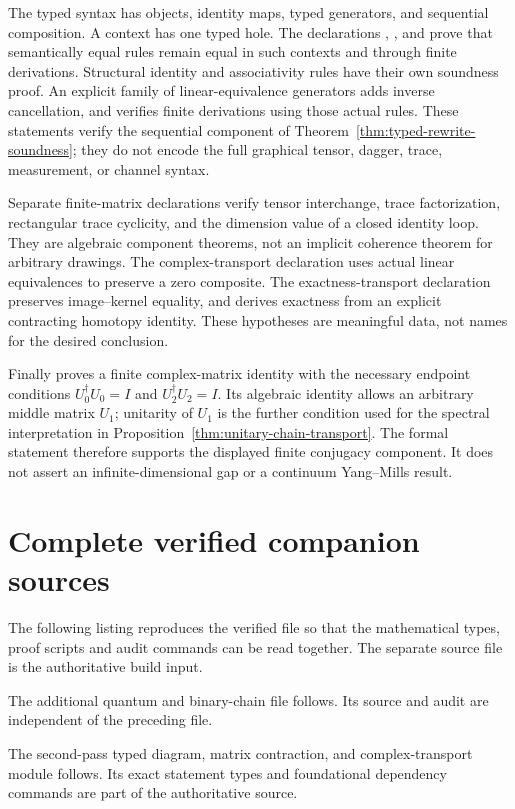 The typed syntax has objects, identity maps, typed generators, and sequential
composition. A context has one typed hole. The declarations
, , and
 prove that semantically equal rules remain equal in
such contexts and through finite derivations. Structural identity and
associativity rules have their own soundness proof. An explicit family of
linear-equivalence generators adds inverse cancellation, and
 verifies finite derivations using those actual
rules. These statements verify the sequential component of
Theorem~\ref{thm:typed-rewrite-soundness}; they do not encode the full graphical
tensor, dagger, trace, measurement, or channel syntax.

Separate finite-matrix declarations verify tensor interchange, trace
factorization, rectangular trace cyclicity, and the dimension value of a
closed identity loop. They are algebraic component theorems, not an implicit
coherence theorem for arbitrary drawings. The complex-transport declaration
uses actual linear equivalences to preserve a zero composite. The
exactness-transport declaration preserves image--kernel equality, and
 derives exactness from an explicit contracting
homotopy identity. These hypotheses are meaningful data, not names for the
desired conclusion.

Finally  proves a finite complex-matrix identity
with the necessary endpoint conditions $U_0^\dagger U_0=I$ and
$U_2^\dagger U_2=I$. Its algebraic identity allows an arbitrary middle
matrix $U_1$; unitarity of $U_1$ is the further condition used for the
spectral interpretation in Proposition~\ref{thm:unitary-chain-transport}.
The formal statement therefore supports the displayed finite conjugacy
component. It does not assert an infinite-dimensional gap or a continuum
Yang--Mills result.

\section{Complete verified companion sources}

The following listing reproduces the verified file so that the mathematical
types, proof scripts and audit commands can be read together. The separate
source file is the authoritative build input.



The additional quantum and binary-chain file follows. Its source and audit
are independent of the preceding file.



The second-pass typed diagram, matrix contraction, and complex-transport
module follows. Its exact statement types and foundational dependency
commands are part of the authoritative source.


